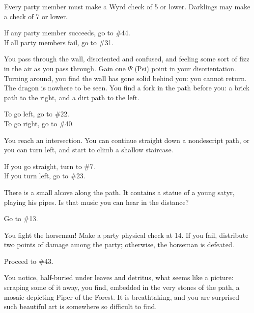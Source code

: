 \documentclass[white]{gl2018}
\begin{document}
\begin{large}
\begin{location}{27}
Every party member must make a Wyrd check of 5 or lower.  Darklings may make a check of 7 or lower. 
\begin{fromhere}
If any party member succeeds, go to \#44.\\
 If all party members fail, go to \#31.
\end{fromhere}
\end{location}
\begin{location}{28}
You pass through the wall, disoriented and confused, and feeling some sort of fizz in the air as you pass through.  Gain one $\Psi$ (Psi) point in your disorientation.  Turning around, you find the wall has gone solid behind you: you cannot return.  The dragon is nowhere to be seen.  You find a fork in the path before you: a brick path to the right, and a dirt path to the left.  
\begin{fromhere}To go left, go to \#22.\\  To go right, go to \#40.\end{fromhere}
\end{location}
\begin{location}{29}
You reach an intersection. You can continue straight down a nondescript path, or you can turn left, and start to climb a shallow staircase.  
\begin{fromhere}If you go straight, turn to \#7.\\ If you turn left, go to \#23.\end{fromhere}
\end{location}
\begin{location}{30}
There is a small alcove along the path. It contains a statue of a young satyr, playing his pipes. Is that music you can hear in the distance? 
\begin{fromhere}Go to \#13.\end{fromhere}
\end{location}
\begin{location}{31}
You fight the horseman!  Make a party physical check at 14.  If you fail, distribute two points of damage among the party; otherwise, the horseman is defeated.
\begin{fromhere}
Proceed to \#43.
\end{fromhere}
\end{location}
\begin{location}{32}
You notice, half-buried under leaves and detritus, what seems like a picture: scraping some of it away, you find, embedded in the very stones of the path, a mosaic depicting Piper of the Forest.  It is breathtaking, and you are surprised such beautiful art is somewhere so difficult to find.

\end{location}
\end{large}
\end{document}
